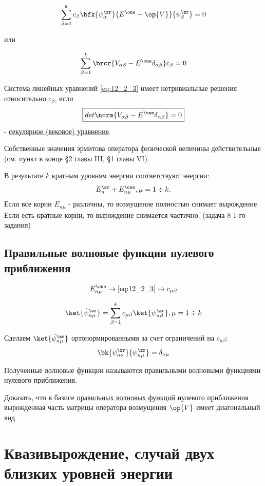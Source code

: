 $$
\sum_{\beta=1}^k c_\beta \bfk{\psi_{\alpha}^\zr}{E^\one - \op{V}}{\psi_{\beta}^\zr} = 0
$$

или 

\begin{equation}
\label{eq:12_2_3}
\sum_{\beta=1}^k \brcr{V_{\alpha \beta} - E^\one \delta_{\alpha \beta}} c_\beta = 0
\end{equation}  

Система линейных уравнений \eqref{eq:12_2_3} имеет нетривиальные решения относительно $c_\beta$, если 
\begin{equation}
\label{eq:12_2_4}
\boxed{det \norm{V_{\alpha \beta} - E^\one \delta_{\alpha \beta}} = 0}
\end{equation} 
- \underline{секулярное (вековое) уравнение}.

Собственные значения эрмитова оператора физической величины действительные (см. пункт в конце \S 2 главы III, \S 1 главы VI).

В результате $k$ кратным уровням энергии соответствуют энергии: 
$$
E_n^\zr + E_{n \mu} ^\one, \mu = 1 \div k.
$$
Если все корни $E_{n \mu}$ - различны, то возмущение полностью снимает вырождение. Если есть кратные корни, то вырождение снимается частично. (задача 8 1-го задания)

\subsection{Правильные волновые функции нулевого приближения}

$$
E_{n \mu}^\one \to \eqref{eq:12_2_3} \to c_{\mu \beta}
$$

$$
\ket{\tilde{\psi}_{n \mu}^\zr} = \sum_{\beta=1}^k c_{\mu \beta} \ket{\psi_{n \beta}^\zr}, \mu = 1 \div k
$$

Сделаем $\ket{\tilde{\psi}_{n \mu}^\zr}$ ортонормированными за счет ограничений на $c_{\mu \beta}$:
$$
\bk{\psi_{n \nu}^\zr}{\psi_{n \mu}^\zr} = \delta_{\nu \mu}
$$

Полученные волновые функции называются правильными волновыми функциями нулевого приближения.

\begin{excr}
Доказать, что в базисе \underline{правильных волновых функций} нулевого приближения вырожденная часть матрицы оператора возмущения $\op{V}$ имеет диагональный вид.
\end{excr}

\section{Квазивырождение, случай двух близких уровней энергии}

